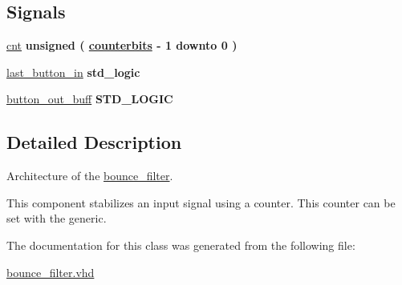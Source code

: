 \subsection*{Signals}
 \begin{DoxyCompactItemize}
\item 
\hypertarget{classbounce__filter_1_1Behavioral_a91ed0cb5ab66576a11c5a2a0de9a88af}{\hyperlink{classbounce__filter_1_1Behavioral_a91ed0cb5ab66576a11c5a2a0de9a88af}{cnt} {\bfseries \textcolor{comment}{unsigned}\textcolor{vhdlchar}{ }\textcolor{vhdlchar}{(}\textcolor{vhdlchar}{ }\textcolor{vhdlchar}{ }{\bfseries \hyperlink{classbounce__filter_a5df2a2aceb759129bf8abccdc30aec13}{counterbits}} \textcolor{vhdlchar}{ }\textcolor{vhdlchar}{-\/}\textcolor{vhdlchar}{ } \textcolor{vhdldigit}{1} \textcolor{vhdlchar}{ }\textcolor{vhdlchar}{ }\textcolor{vhdlchar}{ }\textcolor{vhdlkeyword}{downto}\textcolor{vhdlchar}{ }\textcolor{vhdlchar}{ }\textcolor{vhdlchar}{ } \textcolor{vhdldigit}{0} \textcolor{vhdlchar}{ }\textcolor{vhdlchar}{)}\textcolor{vhdlchar}{ }} }\label{classbounce__filter_1_1Behavioral_a91ed0cb5ab66576a11c5a2a0de9a88af}

\item 
\hypertarget{classbounce__filter_1_1Behavioral_af1b9cebedbee1076cdea82a2084c53d7}{\hyperlink{classbounce__filter_1_1Behavioral_af1b9cebedbee1076cdea82a2084c53d7}{last\-\_\-button\-\_\-in} {\bfseries \textcolor{comment}{std\-\_\-logic}\textcolor{vhdlchar}{ }} }\label{classbounce__filter_1_1Behavioral_af1b9cebedbee1076cdea82a2084c53d7}

\item 
\hypertarget{classbounce__filter_1_1Behavioral_a42b551e04fcfc5a7c7ec2b57a2879dc0}{\hyperlink{classbounce__filter_1_1Behavioral_a42b551e04fcfc5a7c7ec2b57a2879dc0}{button\-\_\-out\-\_\-buff} {\bfseries \textcolor{comment}{S\-T\-D\-\_\-\-L\-O\-G\-I\-C}\textcolor{vhdlchar}{ }} }\label{classbounce__filter_1_1Behavioral_a42b551e04fcfc5a7c7ec2b57a2879dc0}

\end{DoxyCompactItemize}


\subsection{Detailed Description}
Architecture of the \hyperlink{classbounce__filter}{bounce\-\_\-filter}. 

This component stabilizes an input signal using a counter. This counter can be set with the generic. 

The documentation for this class was generated from the following file\-:\begin{DoxyCompactItemize}
\item 
\hyperlink{bounce__filter_8vhd}{bounce\-\_\-filter.\-vhd}\end{DoxyCompactItemize}
